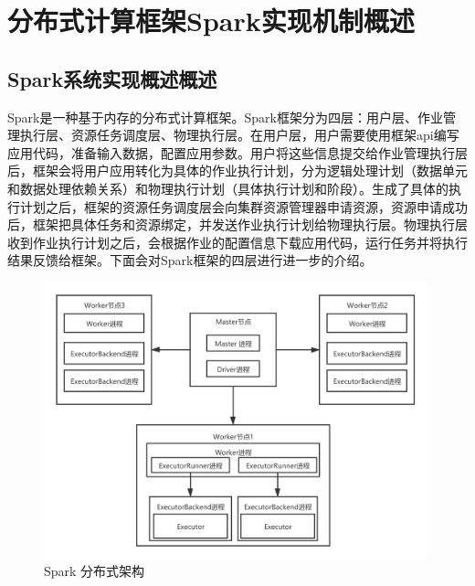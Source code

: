 \chapter{分布式计算框架Spark实现机制概述}\label{chap:basic}
\section{Spark系统实现概述概述}
Spark是一种基于内存的分布式计算框架。Spark框架分为四层：用户层、作业管理执行层、资源任务调度层、物理执行层。在用户层，用户需要使用框架api编写应用代码，准备输入数据，配置应用参数。用户将这些信息提交给作业管理执行层后，框架会将用户应用转化为具体的作业执行计划，分为逻辑处理计划（数据单元和数据处理依赖关系）和物理执行计划（具体执行计划和阶段）。生成了具体的执行计划之后，框架的资源任务调度层会向集群资源管理器申请资源，资源申请成功后，框架把具体任务和资源绑定，并发送作业执行计划给物理执行层。物理执行层收到作业执行计划之后，会根据作业的配置信息下载应用代码，运行任务并将执行结果反馈给框架。下面会对Spark框架的四层进行进一步的介绍。

\begin{figure}[htbp]
    \centering
    \includegraphics[width=0.99\textwidth]{Img/Spark部署架构图.png}
    \caption{Spark 分布式架构}
    \label{fig:spark-framework}
\end{figure}

